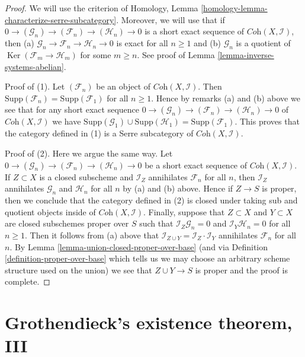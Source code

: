 \documentclass[10pt,a4paper]{amsart}
\theoremstyle{plain}
\theoremstyle{definition}
\theoremstyle{remark}
\numberwithin{equation}{subsection}
\def\Ker{\mathop{\mathrm{Ker}}}
\begin{document}
\begin{proof}
We will use the criterion of
Homology, Lemma \ref{homology-lemma-characterize-serre-subcategory}.
Moreover, we will use that if
$0 \to (\mathcal{G}_n) \to (\mathcal{F}_n) \to (\mathcal{H}_n) \to 0$
is a short exact sequence of $\textit{Coh}(X, \mathcal{I})$, then
(a) $\mathcal{G}_n \to \mathcal{F}_n \to \mathcal{H}_n \to 0$
is exact for all $n \geq 1$ and
(b) $\mathcal{G}_n$ is a quotient of $\Ker(\mathcal{F}_m \to \mathcal{H}_m)$
for some $m \geq n$. See proof of Lemma \ref{lemma-inverse-systems-abelian}.

\medskip\noindent
Proof of (1). Let $(\mathcal{F}_n)$ be an object of
$\textit{Coh}(X, \mathcal{I})$. Then
$\text{Supp}(\mathcal{F}_n) = \text{Supp}(\mathcal{F}_1)$ for all $n \geq 1$.
Hence by remarks (a) and (b) above we see that
for any short exact sequence
$0 \to (\mathcal{G}_n) \to (\mathcal{F}_n) \to (\mathcal{H}_n) \to 0$
of $\textit{Coh}(X, \mathcal{I})$ we have
$\text{Supp}(\mathcal{G}_1) \cup \text{Supp}(\mathcal{H}_1) =
\text{Supp}(\mathcal{F}_1)$.
This proves that the category defined in (1)
is a Serre subcategory of $\textit{Coh}(X, \mathcal{I})$.

\medskip\noindent
Proof of (2). Here we argue the same way. Let
$0 \to (\mathcal{G}_n) \to (\mathcal{F}_n) \to (\mathcal{H}_n) \to 0$
be a short exact sequence of $\textit{Coh}(X, \mathcal{I})$.
If $Z \subset X$ is a closed subscheme and $\mathcal{I}_Z$
annihilates $\mathcal{F}_n$ for all $n$, then
$\mathcal{I}_Z$ annihilates $\mathcal{G}_n$ and $\mathcal{H}_n$
for all $n$ by (a) and (b) above.
Hence if $Z \to S$ is proper, then we conclude that the category
defined in (2) is closed under taking sub and quotient objects
inside of $\textit{Coh}(X, \mathcal{I})$.
Finally, suppose that $Z \subset X$ and $Y \subset X$ are
closed subschemes proper over $S$ such that
$\mathcal{I}_Z \mathcal{G}_n = 0$ and
$\mathcal{I}_Y \mathcal{H}_n = 0$ for all $n \geq 1$.
Then it follows from (a) above that
$\mathcal{I}_{Z \cup Y} = \mathcal{I}_Z \cdot \mathcal{I}_Y$
annihilates $\mathcal{F}_n$ for all $n$.
By Lemma \ref{lemma-union-closed-proper-over-base}
(and via Definition \ref{definition-proper-over-base} which
tells us we may choose an arbitrary scheme structure used on the union)
we see that $Z \cup Y \to S$ is proper and the proof is complete.
\end{proof}








\section{Grothendieck's existence theorem, III}
\label{section-existence-proper-support}
\end{document}

